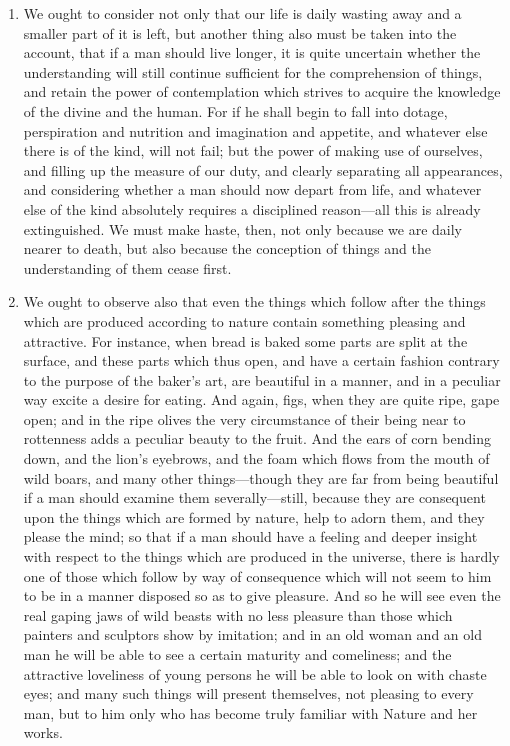 \begin{enumerate}
\item We ought to consider not only that our life is daily wasting away and a smaller part of it is left, but another thing also must be taken into the account, that if a man should live longer, it is quite uncertain whether the understanding will still continue sufficient for the comprehension of things, and retain the power of contemplation which strives to acquire the knowledge of the divine and the human. For if he shall begin to fall into dotage, perspiration and nutrition and imagination and appetite, and whatever else there is of the kind, will not fail; but the power of making use of ourselves, and filling up the measure of our duty, and clearly separating all appearances, and considering whether a man should now depart from life, and whatever else of the kind absolutely requires a disciplined reason—all this is already extinguished. We must make haste, then, not only because we are daily nearer to death, but also because the conception of things and the understanding of them cease first.

\item We ought to observe also that even the things which follow after the things which are produced according to nature contain something pleasing and attractive. For instance, when bread is baked some parts are split at the surface, and these parts which thus open, and have a certain fashion contrary to the purpose of the baker's art, are beautiful in a manner, and in a peculiar way excite a desire for eating. And again, figs, when they are quite ripe, gape open; and in the ripe olives the very circumstance of their being near to rottenness adds a peculiar beauty to the fruit. And the ears of corn bending down, and the lion's eyebrows, and the foam which flows from the mouth of wild boars, and many other things—though they are far from being beautiful if a man should examine them severally—still, because they are consequent upon the things which are formed by nature, help to adorn them, and they please the mind; so that if a man should have a feeling and deeper insight with respect to the things which are produced in the universe, there is hardly one of those which follow by way of consequence which will not seem to him to be in a manner disposed so as to give pleasure. And so he will see even the real gaping jaws of wild beasts with no less pleasure than those which painters and sculptors show by imitation; and in an old woman and an old man he will be able to see a certain maturity and comeliness; and the attractive loveliness of young persons he will be able to look on with chaste eyes; and many such things will present themselves, not pleasing to every man, but to him only who has become truly familiar with Nature and her works.


\end{enumerate}
